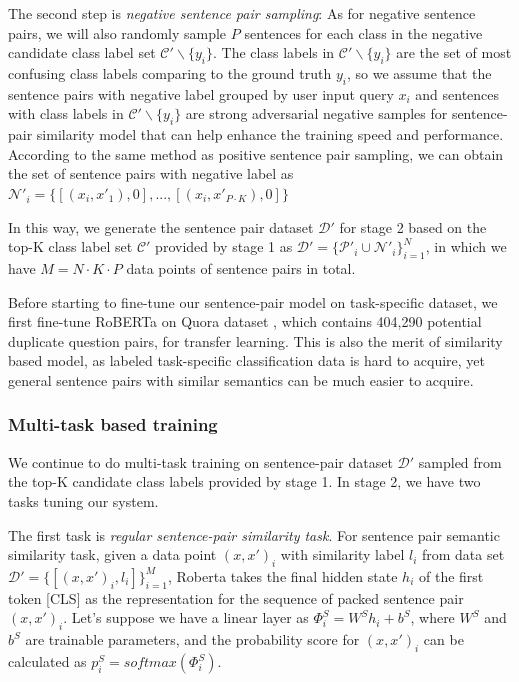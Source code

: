 \documentclass[letterpaper]{article} %
\begin{document}
  The  second  step  is  \emph{negative sentence pair sampling}: As for negative
  sentence  pairs,  we will also randomly sample $P$ sentences for each class in
  the negative candidate class label set $\mathcal{C'}\backslash \{y_{i}\}$. The
  class  labels  in  $\mathcal{C'}\backslash  \{y_{i}\}$  are  the  set  of most
  confusing  class  labels comparing to the ground truth ${y_{i}}$, so we assume
  that  the  sentence  pairs  with  negative  label  grouped by user input query
  $x_{i}$  and sentences with class labels in $\mathcal{C'}\backslash \{y_{i}\}$
  are  strong  adversarial  negative  samples for sentence-pair similarity model
  that  can  help  enhance  the training speed and performance. According to the
  same  method  as  positive  sentence  pair  sampling, we can obtain the set of
  sentence  pairs  with  negative label as $\mathcal{N'}_{i}=\{[(x_{i}, x'_{1}),
  0], ..., [(x_{i}, x'_{P\cdot K}), 0]\}$

  In  this way, we generate the sentence pair dataset $\mathcal{D'}$ for stage 2
  based  on  the  top-K  class  label  set $\mathcal{C'}$ provided by stage 1 as
  $\mathcal{D'}=\{\mathcal{P'}_{i}\cup  \mathcal{N'}_{i}\}_{i=1}^{N}$,  in which
  we have $M=N\cdot K\cdot P$ data points of sentence pairs in total.

  Before starting to fine-tune our sentence-pair model on task-specific dataset,
  we  first  fine-tune  RoBERTa  on  Quora  dataset  \cite{iyer2017first}, which
  contains  404,290  potential  duplicate question pairs, for transfer learning.
  This  is  also  the  merit of similarity based model, as labeled task-specific
  classification  data  is  hard  to  acquire,  yet  general sentence pairs with
  similar semantics can be much easier to acquire.

  \subsubsection*{Multi-task based training}
  We   continue  to  do  multi-task  training  on  sentence-pair  dataset
  $\mathcal{D'}$ sampled from the top-K candidate class labels provided by stage
  1. In stage 2, we have two tasks tuning our system.

  The first task is \emph{regular sentence-pair similarity task}.
  For  sentence  pair semantic similarity task, given a data point $(x, x')_{i}$
  with       similarity       label       $l_{i}$       from       data      set
  $\mathcal{D'}=\{[(x,x')_{i},l_{i}]\}_{i=1}^{M}$,   Roberta   takes  the  final
  hidden  state  $h_{i}$  of the first token [CLS] as the representation for the
  sequence of packed sentence pair $(x, x')_{i}$. Let's suppose we have a linear
  layer  as  ${\Phi}^S_{i}=W^Sh_{i}+b^S$,  where  $W^S$  and $b^S$ are trainable
  parameters,  and  the probability score for $(x, x')_{i}$ can be calculated as
  $p^S_{i}=softmax({\Phi}^S_{i})$.
\end{document}
